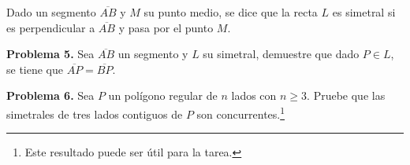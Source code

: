 \documentclass{article}
\begin{document}
\vspace{5mm}
\begin{dfn}
    Dado un segmento $\overline{AB}$ y $M$ su punto medio, se dice que la recta $L$ es simetral si 
    es perpendicular a $\overline{AB}$ y pasa por el punto $M$.
\end{dfn}
\vspace{2mm}
\noindent\textbf{Problema 5.} Sea $\overline{AB}$ un segmento y $L$ su simetral, demuestre que 
dado $P\in L$, se tiene que $\overline{AP}=\overline{BP}$.

\vspace{5mm}
\noindent\textbf{Problema 6.} Sea $P$ un polígono regular de $n$ lados con $n\geq3$. Pruebe que 
las simetrales de tres lados contiguos de $P$ son concurrentes.\footnote{Este resultado puede ser 
útil para la tarea.}

\end{document}
